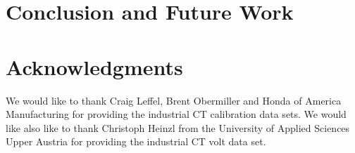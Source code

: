 
\section{Conclusion and Future Work}
\label{section:conclusion}




\section{Acknowledgments}

We would like to thank Craig Leffel, Brent Obermiller 
and Honda of America Manufacturing
for providing the industrial CT calibration data sets.
We would like also like to thank Christoph Heinzl
from the University of Applied Sciences Upper Austria
for providing the industrial CT volt data set.

